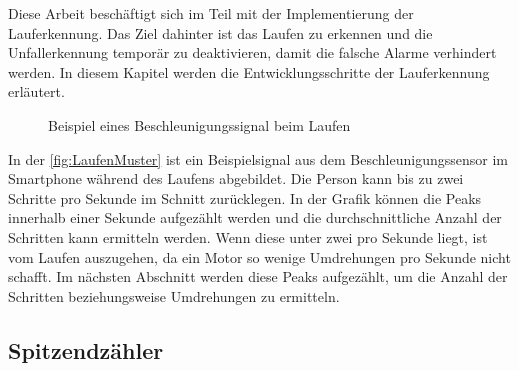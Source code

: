 Diese Arbeit beschäftigt sich im Teil mit der Implementierung der Lauferkennung. Das Ziel dahinter ist das Laufen zu erkennen und die Unfallerkennung temporär zu deaktivieren, damit die falsche Alarme verhindert werden.
In diesem Kapitel werden die Entwicklungsschritte der Lauferkennung erläutert.

%

\begin{figure}
	\centering
	\caption{Beispiel eines Beschleunigungssignal beim Laufen}
	\label{fig:LaufenMuster}
\end{figure}
In der \autoref{fig:LaufenMuster} ist ein Beispielsignal aus dem Beschleunigungssensor im Smartphone während des Laufens abgebildet. Die Person kann bis zu zwei Schritte pro Sekunde im Schnitt zurücklegen. In der Grafik können die Peaks innerhalb einer Sekunde aufgezählt werden und die durchschnittliche Anzahl der Schritten kann ermitteln werden. Wenn diese unter zwei pro Sekunde liegt, ist vom Laufen auszugehen, da ein Motor so wenige Umdrehungen pro Sekunde nicht schafft. Im nächsten Abschnitt werden diese Peaks aufgezählt, um die Anzahl der Schritten beziehungsweise Umdrehungen zu ermitteln.
%
\subsection{Spitzendzähler} \label{abs:PeaksAufzaehlen} %

